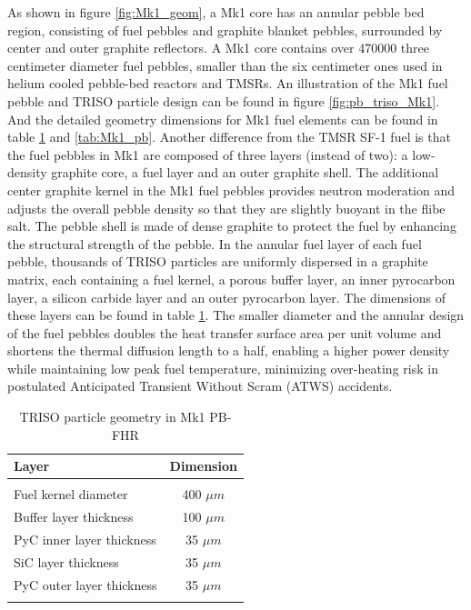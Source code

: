 \documentclass{elsarticle}
\begin{document}
As shown in figure \ref{fig:Mk1_geom}, a Mk1 core has an annular pebble bed region, consisting of fuel pebbles and graphite blanket pebbles, surrounded by center and outer graphite reflectors. 
A Mk1 core contains over 470000 three centimeter diameter fuel pebbles, smaller than the six centimeter ones used in helium cooled pebble-bed reactors and TMSRs. 
An illustration of the Mk1 fuel pebble and TRISO particle design can be found in figure \ref{fig:pb_triso_Mk1}. And the detailed geometry dimensions for Mk1 fuel elements can be found in table \ref{tab:Mk1_triso} and \ref{tab:Mk1_pb}.
Another difference from the TMSR SF-1 fuel is that the fuel pebbles in Mk1 are composed of three layers (instead of two): a low-density graphite core, a fuel layer and an outer graphite shell. The additional center graphite kernel in the Mk1 fuel pebbles provides neutron moderation and adjusts the overall pebble density so that they are slightly buoyant in the flibe salt. The pebble shell is made of dense graphite to protect the fuel by enhancing the structural strength of the pebble. In the annular fuel layer of each fuel pebble, thousands of TRISO particles are uniformly dispersed in a graphite matrix, each containing a fuel kernel, a porous buffer layer, an inner pyrocarbon layer, a silicon carbide layer and an outer pyrocarbon layer. The dimensions of these layers can be found in table \ref{tab:Mk1_triso}.
The smaller diameter and the annular design of the fuel pebbles doubles the heat transfer surface area per unit volume and shortens the thermal diffusion length to a half, enabling a higher power density while maintaining low peak fuel temperature, minimizing over-heating risk in postulated Anticipated Transient Without Scram (ATWS) accidents.

\begin{table}[h]
    \centering
    \begin{tabular}{lc}
        Layer & Dimension\\
        \hline\\
        Fuel kernel diameter & 400 $\mu m$ \\
        Buffer layer thickness & 100 $\mu m$\\
        PyC inner layer thickness &35 $\mu m$\\
        SiC layer thickness & 35 $\mu m$\\
        PyC outer layer thickness & 35 $\mu m$\\
        \hline\\
    \end{tabular}
    \caption{TRISO particle geometry in Mk1 PB-FHR \cite{Andreades2016}}
    \label{tab:Mk1_triso}
\end{table}
\end{document}
